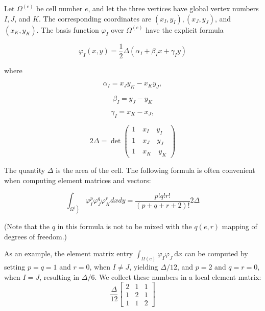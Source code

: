 \documentclass[../main.tex]{subfiles}
\begin{document}
	Let $\Omega^{(e)}$ be cell number $e$, and let the three vertices have global vertex numbers $I, J$, and $K$. The corresponding coordinates are $\left(x_{I}, y_{I}\right),\left(x_{J}, y_{J}\right)$, and $\left(x_{K}, y_{K}\right)$. The basis function $\varphi_{I}$ over $\Omega^{(e)}$ have the explicit formula
	
	\begin{equation}
		\label{eqa205}
		\varphi_{I}(x, y)=\frac{1}{2} \Delta\left(\alpha_{I}+\beta_{I} x+\gamma_{I} y\right)
	\end{equation}

	\noindent where
	
	\begin{equation}
		\label{eqa206}
			\alpha_{I} =x_{J} y_{K}-x_{K} y_{J}, 
	\end{equation}

	\begin{equation}
		\label{eqa207}
			\beta_{I} =y_{J}-y_{K}
	\end{equation}

	\begin{equation}
		\label{eqa208}
			\gamma_{I} =x_{K}-x_{J},
	\end{equation}

	\begin{equation}
		\label{eqa209}
			2 \Delta =\operatorname{det}\left(\begin{array}{ccc}
				1\quad  x_{I}\quad  y_{I} \\
				1\quad  x_{J}\quad  y_{J} \\
				1\quad  x_{K}\quad  y_{K}
			\end{array}\right)
	\end{equation}

	\noindent The quantity $\Delta$ is the area of the cell. \smallbreak
	The following formula is often convenient when computing element matrices and vectors:
	
	\begin{equation}
		\label{eqa210}
		\int_{\left.\Omega^{(}\right)} \varphi_{I}^{p} \varphi_{J}^{q} \varphi_{K}^{r} d x d y=\frac{p ! q ! r !}{(p+q+r+2) !} 2 \Delta
	\end{equation}

	\noindent (Note that the $q$ in this formula is not to be mixed with the $q(e, r)$ mapping of degrees of freedom.)
	
	As an example, the element matrix entry $\int_{\Omega(c)} \varphi_{I} \varphi_{J} \mathrm{~d} x$ can be computed by setting $p=q=1$ and $r=0$, when $I \neq J$, yielding $\Delta / 12$, and $p=2$ and $q=r=0$, when $I=J$, resulting in $\Delta / 6$. We collect these numbers in a local element matrix:
	$$
	\frac{\Delta}{12}\left[\begin{array}{lll}
		2 & 1 & 1 \\
		1 & 2 & 1 \\
		1 & 1 & 2
	\end{array}\right]
	$$
	
\end{document}
